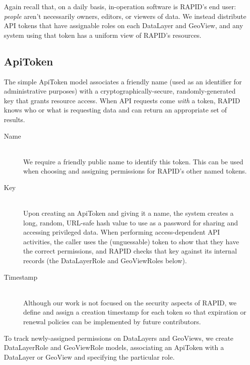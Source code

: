 Again recall that, on a daily basis, in-operation software is RAPID's end user: \textit{people} aren't necessarily owners, editors, or viewers of data. We instead distribute API tokens that have assignable roles on each DataLayer and GeoView, and any system using that token has a uniform view of RAPID's resources.

\subsection{ApiToken}
The simple ApiToken model associates a friendly name (used as an identifier for administrative purposes) with a cryptographically-secure, randomly-generated key that grants resource access. When API requests come \textit{with} a token, RAPID knows who or what is requesting data and can return an appropriate set of results.

\begin{description}
\item[Name] \hfill \\
We require a friendly public name to identify this token. This can be used when choosing and assigning permissions for RAPID's other named tokens.

\item[Key] \hfill \\
Upon creating an ApiToken and giving it a name, the system creates a long, random, URL-safe hash value to use as a password for sharing and accessing privileged data. When performing access-dependent API activities, the caller uses the (unguessable) token to show that they have the correct permissions, and RAPID checks that key against its internal records (the DataLayerRole and GeoViewRoles below).

\item[Timestamp] \hfill \\
Although our work is not focused on the security aspects of RAPID, we define and assign a creation timestamp for each token so that expiration or renewal policies can be implemented by future contributors.

\end{description}
To track newly-assigned permissions on DataLayers and GeoViews, we create DataLayerRole and GeoViewRole models, associating an ApiToken with a DataLayer or GeoView and specifying the particular role.

